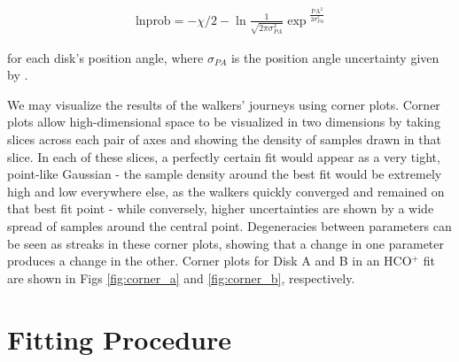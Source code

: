 \begin{align}
  \text{lnprob} = -\chi/2  -\ln{\frac{1}{\sqrt{2 \pi \sigma_{PA}^2}}} \exp{^{\frac{\text{PA}^2}{2 \sigma_{PA}^2}}}
\end{align}

\noindent
for each disk's position angle, where $\sigma_{PA}$ is the position angle uncertainty given by \citet{Williams2014}.



We may visualize the results of the walkers' journeys using corner plots. Corner plots allow high-dimensional space to be visualized in two dimensions by taking slices across each pair of axes and showing the density of samples drawn in that slice. In each of these slices, a perfectly certain fit would appear as a very tight, point-like Gaussian - the sample density around the best fit would be extremely high and low everywhere else, as the walkers quickly converged and remained on that best fit point - while conversely, higher uncertainties are shown by a wide spread of samples around the central point. Degeneracies between parameters can be seen as streaks in these corner plots, showing that a change in one parameter produces a change in the other. Corner plots for Disk A and B in an HCO$^+$ fit are shown in Figs \ref{fig:corner_a} and \ref{fig:corner_b}, respectively.







\section{Fitting Procedure}
\label{section:fitting_procedure}

